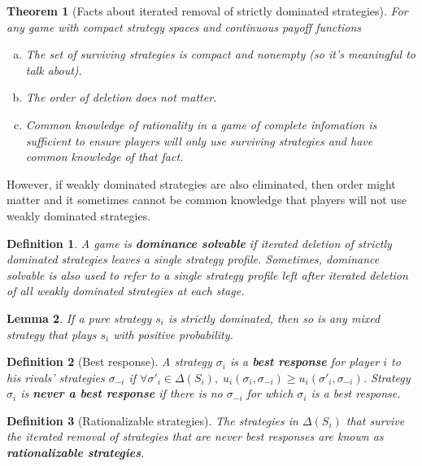 \documentclass[letter, 11pt]{article}
\theoremstyle{basic}
\newtheorem{definition}{Definition}[section]
\newtheorem{theorem}{Theorem}[section]
\newtheorem{lemma}[theorem]{Lemma}
\begin{document}
\begin{spacing}{1.0}
\begin{theorem}[Facts about iterated removal of strictly dominated
  strategies]
  For any game with compact strategy spaces and continuous payoff functions
  \begin{enumerate}[a)]\leftskip = 1em
  \item The set of surviving strategies is compact and
    nonempty (so it's meaningful to talk about).
  \item The order of deletion does not matter.
  \item Common knowledge of rationality in a game of complete infomation is
    sufficient to ensure players will only use surviving strategies and
    have common knowledge of that fact.
  \end{enumerate}
\end{theorem}

However, if weakly dominated strategies are also eliminated, then
order might matter and it sometimes cannot be common knowledge that players
will not use weakly dominated strategies.

\begin{definition}
  A game is \textbf{dominance solvable} if iterated deletion of strictly
  dominated strategies leaves a single strategy profile. Sometimes,
  dominance solvable is also used to refer to a single strategy profile
  left after iterated deletion of all weakly dominated strategies at each
  stage.
\end{definition}

\begin{lemma}
  If a pure strategy $s_i$ is strictly dominated, then so is any mixed
  strategy that plays $s_i$ with positive probability.
\end{lemma}

\begin{definition}[Best response]
  A strategy $\sigma_i$ is a \textbf{best response} for
  player $i$ to his rivals' strategies $\sigma_{-i}$ if $\forall \sigma'_i
  \in \Delta(S_i),\; u_i(\sigma_i, \sigma_{-i}) \geq u_i(\sigma'_i,
  \sigma_{-i})$. Strategy $\sigma_i$ is \textbf{never a best response} if
  there is no $\sigma_{-i}$ for which $\sigma_i$ is a best response.
\end{definition}

\begin{definition}[Rationalizable strategies]
  The strategies in $\Delta(S_i)$ that survive
  the iterated removal of strategies that are never best responses are
  known as \textbf{rationalizable strategies}.
\end{definition}


\end{spacing}
\end{document}
